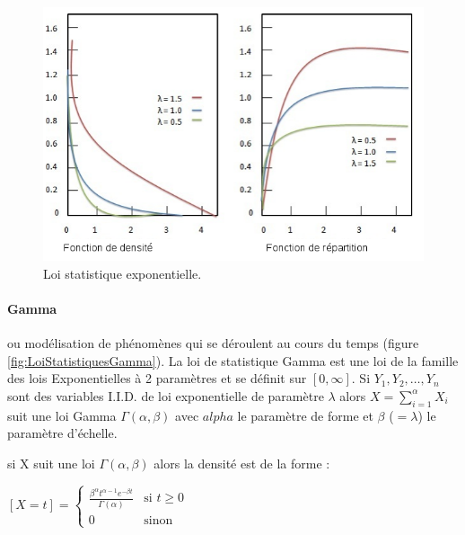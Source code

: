 \documentclass[a4paper,12pt]{report}
\theoremstyle{plain}				%
\theoremstyle{definition}				%
\begin{document}
\begin{figure}
{\centering
\includegraphics[width=\columnwidth]{loiStatExponentielle.png}
\caption{Loi statistique exponentielle.}
\label{fig:LoiStatistiquesExponentielle}
\par}
\end{figure}

\paragraph{Gamma}
ou modélisation de phénomènes qui se déroulent au cours du temps (figure \ref{fig:LoiStatistiquesGamma}). 
La loi de statistique Gamma est une loi de la famille des lois Exponentielles à 2 paramètres 
  et se définit sur $[0, \infty]$.
Si $Y_1, Y_2, \ldots, Y_n$ sont des variables I.I.D. 
  de loi exponentielle de paramètre $\lambda$ alors $X=\sum_{ i= 1}^{\alpha} X_i$  
  suit une loi Gamma $\Gamma(\alpha, \beta)$ avec 
    $alpha$ le paramètre de forme et 
    $\beta$ ($=\lambda$) le paramètre d'échelle. 
  
si X suit une loi $\Gamma(\alpha, \beta)$ alors la densité est de la forme :

  \begin{center}
  $[X=t] = \left\{
    \begin{array}{ll}
    	\frac{\beta^{\alpha} t^{\alpha-1} e^{-\beta t}}{\Gamma(\alpha)}  & 
    	\mbox{si } t \geq 0  \\
        0 & 
        \mbox{sinon}
    \end{array}
	\right.$
  \label{definitionLoiGammaDensite}
  \end{center}
   
\end{document}
